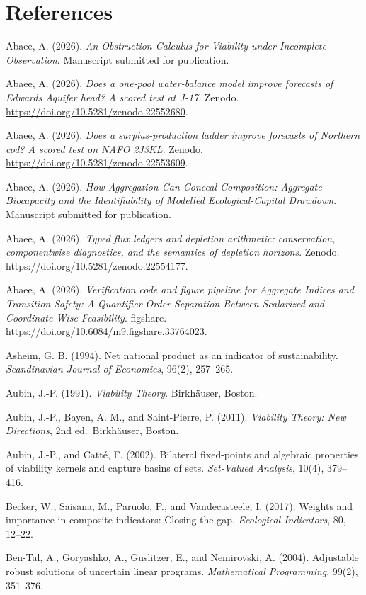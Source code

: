 \documentclass[3p,11pt]{elsarticle}
\begin{document}
\section*{References}\label{references}

Abaee, A. (2026). \emph{An Obstruction Calculus for Viability under Incomplete Observation}. Manuscript submitted for publication.

Abaee, A. (2026). \emph{Does a one-pool water-balance model improve forecasts of Edwards Aquifer head? A scored test at J-17}. Zenodo. \url{https://doi.org/10.5281/zenodo.22552680}.

Abaee, A. (2026). \emph{Does a surplus-production ladder improve forecasts of Northern cod? A scored test on NAFO 2J3KL}. Zenodo. \url{https://doi.org/10.5281/zenodo.22553609}.

Abaee, A. (2026). \emph{How Aggregation Can Conceal Composition: Aggregate Biocapacity and the Identifiability of Modelled Ecological-Capital Drawdown}. Manuscript submitted for publication.

Abaee, A. (2026). \emph{Typed flux ledgers and depletion arithmetic: conservation, componentwise diagnostics, and the semantics of depletion horizons}. Zenodo. \url{https://doi.org/10.5281/zenodo.22554177}.

Abaee, A. (2026). \emph{Verification code and figure pipeline for Aggregate Indices and Transition Safety: A Quantifier-Order Separation Between Scalarized and Coordinate-Wise Feasibility}. figshare. \url{https://doi.org/10.6084/m9.figshare.33764023}.

Asheim, G. B. (1994). Net national product as an indicator of sustainability. \emph{Scandinavian Journal of Economics}, 96(2), 257--265.

Aubin, J.-P. (1991). \emph{Viability Theory}. Birkh\"auser, Boston.

Aubin, J.-P., Bayen, A. M., and Saint-Pierre, P. (2011). \emph{Viability Theory: New Directions}, 2nd ed.~Birkh\"auser, Boston.

Aubin, J.-P., and Catt\'e, F. (2002). Bilateral fixed-points and algebraic properties of viability kernels and capture basins of sets. \emph{Set-Valued Analysis}, 10(4), 379--416.

Becker, W., Saisana, M., Paruolo, P., and Vandecasteele, I. (2017). Weights and importance in composite indicators: Closing the gap. \emph{Ecological Indicators}, 80, 12--22.

Ben-Tal, A., Goryashko, A., Guslitzer, E., and Nemirovski, A. (2004).
Adjustable robust solutions of uncertain linear programs.
\emph{Mathematical Programming}, 99(2), 351--376.
\end{document}
